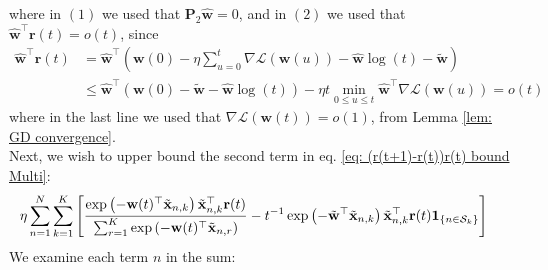 \documentclass[twoside,11pt,english]{article}
\newcommand{\sumk}{\sum_{k=1}^{K}}
\newcommand{\sumr}{\sum_{r=1}^{K}}
\newcommand{\xtilde}{\tilde{\vect{x}}_{n,k}}
\newcommand{\xtilder}{\tilde{\vect{x}}_{n,r}}
\newcommand{\vect}[1]{\mathbf{#1}}
\newcommand{\bm}[1]{\ensuremath{\boldsymbol{#1}}}
\newcommand{\indicator}[1]{\bm{1}_{\{ #1 \}}}
\begin{document}
where in $\left(1\right)$ we used that ${\mathbf{P}}_{2}\hat{\mathbf{w}}=0$, and in $\left(2\right)$ we used that $\hat{\mathbf{w}}^{\top}\mathbf{r}\left(t\right)=o\left(t\right)$,
since 
\begin{align*}
\hat{\mathbf{w}}^{\top}\mathbf{r}\left(t\right) & =\hat{\mathbf{w}}^{\top}\left(\mathbf{w}\left(0\right)-\eta\sum_{u=0}^{t}\nabla\mathcal{L}\left(\mathbf{w}\left(u\right)\right)-\hat{\mathbf{w}}\log\left(t\right)-\tilde{\mathbf{w}}\right)\\
& \leq\hat{\mathbf{w}}^{\top}\left(\mathbf{w}\left(0\right)-\tilde{\mathbf{w}}-\hat{\mathbf{w}}\log\left(t\right)\right)-\eta t\min_{0\leq u\leq t}\hat{\mathbf{w}}^{\top}\nabla\mathcal{L}\left(\mathbf{w}\left(u\right)\right)=o\left(t\right)
\end{align*}
where in the last line we used that $\nabla\mathcal{L}\left(\mathbf{w}\left(t\right)\right)=o\left(1\right)$,
from Lemma \ref{lem: GD convergence}.\\
Next, we wish to upper bound the second term in eq. \ref{eq: (r(t+1)-r(t))r(t) bound Multi}:
\begin{align}
&\eta \sumn  \sumk \left[ \frac{\e\left(-\wvec(t)^\top\xtilde\right)\xtilde^\top\rvec(t)}{\sumr \e\left(-\wvec(t)^\top\xtilder\right)} - t^{-1}\e\left(-\wtilde^\top \xtilde\right)\xtilde^\top\rvec(t) \indicator{n\in\mathcal{S}_k} \right]
\end{align}
\newpage
We examine each term $n$ in the sum:
\end{document}
